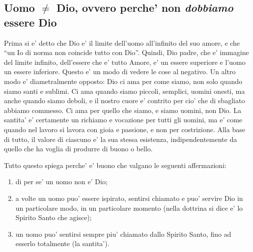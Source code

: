 \subsection{Uomo $\ne$ Dio, ovvero perche' non \emph{dobbiamo} essere Dio}
Prima si e' detto che Dio e' il limite dell'uomo all'infinito del suo amore, e che ``un Io di norma non coincide tutto con Dio''.
Quindi, Dio padre, che e' immagine del limite infinito, dell'essere che e' tutto Amore, e' un essere superiore e l'uomo un essere inferiore.
Questo e' un modo di vedere le cose al negativo. Un altro modo e' diametralmente opposto: Dio ci ama per come siamo, non solo quando siamo santi e sublimi. Ci ama quando siamo piccoli, semplici, uomini onesti, ma anche quando siamo deboli, e il nostro cuore e' contrito per cio' che di sbagliato abbiamo commesso. Ci ama per quello che siamo, e siamo uomini, non Dio. La santita' e' certamente un richiamo e vocazione per tutti gli uomini, ma e' come quando nel lavoro si lavora con gioia e passione, e non per costrizione. Alla base di tutto, il valore di ciascuno e' la sua stessa esistenza, indipendentemente da quello che ha voglia di produrre di buono o bello.

Tutto questo spiega perche' e' buono che valgano le seguenti affermazioni:
\begin{enumerate}
    \item di per se' un uomo non e' Dio;
    \item a volte un uomo puo' essere ispirato, sentirsi chiamato e puo' servire Dio in un particolare modo, in un particolare momento (nella dottrina si dice e' lo Spirito Santo che agisce);
    \item un uomo puo' sentirsi sempre piu' chiamato dallo Spirito Santo, fino ad esserlo totalmente (la santita').
\end{enumerate}

